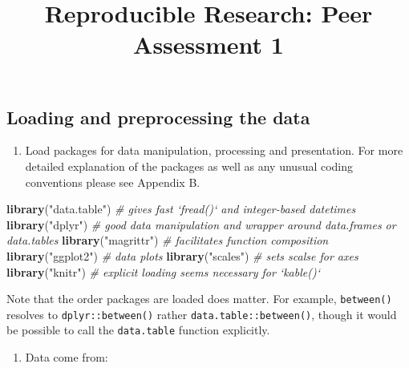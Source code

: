 \documentclass[]{article}
\title{Reproducible Research: Peer Assessment 1}
\author{}
\date{}
\newenvironment{Shaded}{\begin{snugshade}}{\end{snugshade}}
\newcommand{\KeywordTok}[1]{\textcolor[rgb]{0.13,0.29,0.53}{\textbf{{#1}}}}
\newcommand{\StringTok}[1]{\textcolor[rgb]{0.31,0.60,0.02}{{#1}}}
\newcommand{\CommentTok}[1]{\textcolor[rgb]{0.56,0.35,0.01}{\textit{{#1}}}}
\newcommand{\NormalTok}[1]{{#1}}
\begin{document}
\maketitle


{
\hypersetup{linkcolor=black}
\setcounter{tocdepth}{2}
\tableofcontents
}
\subsection{Loading and preprocessing the
data}\label{loading-and-preprocessing-the-data}

\begin{enumerate}
\def\labelenumi{\arabic{enumi}.}
\itemsep1pt\parskip0pt
\item
  Load packages for data manipulation, processing and presentation. For
  more detailed explanation of the packages as well as any unusual
  coding conventions please see Appendix B.
\end{enumerate}

\begin{Shaded}
\begin{Highlighting}[]
\KeywordTok{library}\NormalTok{(}\StringTok{"data.table"}\NormalTok{) }\CommentTok{# gives fast `fread()` and integer-based datetimes}
\KeywordTok{library}\NormalTok{(}\StringTok{"dplyr"}\NormalTok{) }\CommentTok{# good data manipulation and wrapper around data.frames or data.tables}
\KeywordTok{library}\NormalTok{(}\StringTok{"magrittr"}\NormalTok{) }\CommentTok{# facilitates function composition}
\KeywordTok{library}\NormalTok{(}\StringTok{"ggplot2"}\NormalTok{) }\CommentTok{# data plots}
\KeywordTok{library}\NormalTok{(}\StringTok{"scales"}\NormalTok{) }\CommentTok{# sets scalse for axes }
\KeywordTok{library}\NormalTok{(}\StringTok{"knitr"}\NormalTok{) }\CommentTok{# explicit loading seems necessary for `kable()`}
\end{Highlighting}
\end{Shaded}

Note that the order packages are loaded does matter. For example,
\texttt{between()} resolves to \texttt{dplyr::between()} rather
\texttt{data.table::between()}, though it would be possible to call the
\texttt{data.table} function explicitly.

\begin{enumerate}
\def\labelenumi{\arabic{enumi}.}
\setcounter{enumi}{1}
\itemsep1pt\parskip0pt
\item
  Data come from:
\end{enumerate}
\end{document}
